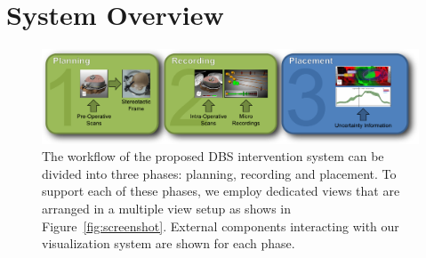 \documentclass{vgtc}                          %
\begin{document}

%
%

\section{System Overview}\label{sec:overview}
\begin{figure}[t]
    \centering
    \includegraphics[width=0.8\linewidth]{figures/workflow}
    \caption{The workflow of the proposed DBS intervention system can be divided into three phases: planning, recording and placement. To support each of these phases, we employ dedicated views that are arranged in a multiple view setup as shows in Figure~\ref{fig:screenshot}. External components interacting with our visualization system are shown for each phase.}
    \label{fig:workflow}
\end{figure}
\end{document}
